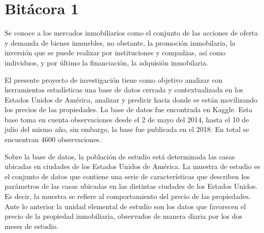 \documentclass[
  oneside]{memoir}
\begin{document}
\begin{titlingpage}
\begin{center}


 
  \end{center}

\end{titlingpage}


\mainmatter
\fancyhead[LE,RO]{\slshape \rightmark}
\fancyhead[LO,RE]{\slshape \leftmark}
\rhead{\thepage}
\fancyfoot[C]{\thepage}

\tableofcontents*

\newpage
\chapter{Bitácora 1}

Se conoce a los mercados inmobiliarios como el conjunto de las acciones
de oferta y demanda de bienes inmuebles, no obstante, la promoción
inmobilaria, la inversión que se puede realizar por instituciones y
compañias, así como individuos, y por último la financiación, la
adquisión inmobilaria.

El presente proyecto de investigación tiene como objetivo analizar con
herramientas estadísticas una base de datos cerrada y contextualizada en
los Estados Unidos de América, analizar y predicir hacia donde se están
movilizando los precios de las propiedades. La base de datos fue
encontrada en Kaggle. Esta base toma en cuenta observaciones desde el 2
de mayo del 2014, hasta el 10 de julio del mismo año, sin embargo, la
base fue publicada en el 2018. En total se encuentran 4600
observaciones.

Sobre la base de datos, la población de estudio está determinada las
casas ubicadas en ciudades de los Estados Unidos de América. La muestra
de estudio es el conjunto de datos que contiene una serie de
características que describen los parámetros de las casas ubicadas en
las distintas ciudades de los Estados Unidos. Es decir, la muestra se
refiere al comportamiento del precio de las propiedades. Ante lo
anterior la unidad elemental de estudio son los datos que favorecen el
precio de la propiedad inmobiliaria, observados de manera diaria por los
dos meses de estudio.
\end{document}
